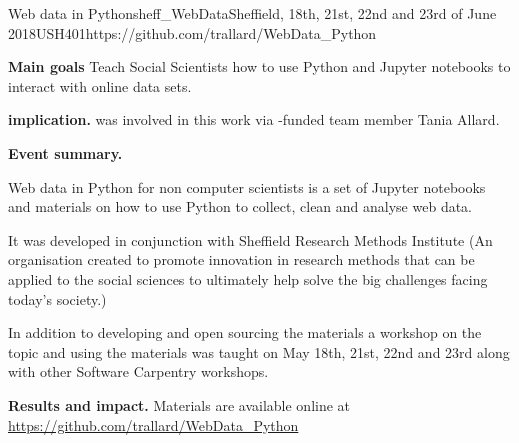 \begin{event}{Web data in Python}{sheff_WebData}{Sheffield, 18th, 21st, 22nd and 23rd of June 2018}{USH}{40}{1}{https://github.com/trallard/WebData_Python}

\textbf{Main goals} Teach Social Scientists how to use Python and Jupyter notebooks to interact with online data sets.

\textbf{\ODK implication.} \ODK was involved in this work via \ODK-funded team member Tania Allard.

\textbf{Event summary.}

Web data in Python for non computer scientists is a set of Jupyter notebooks and materials on how to use Python to collect, clean and analyse web data.

 It was developed in conjunction with Sheffield Research Methods Institute (An organisation created to promote innovation in research methods that can be applied to the social sciences to ultimately help solve the big challenges facing today’s society.)

In addition to developing and open sourcing the materials a workshop on the topic and using the materials was taught on May 18th, 21st, 22nd and 23rd along with other Software Carpentry workshops.

\textbf{Results and impact.} Materials are available online at \url{https://github.com/trallard/WebData_Python}

\end{event}
